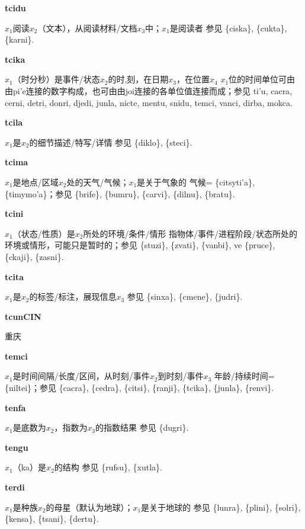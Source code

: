 \documentclass[notitlepage,twocolumn,a4paper,10pt]{book}
\begin{document}
{\sffamily\bfseries tcidu}\enspace {\ttfamily\bfseries[tid]}  $x_1$阅读$x_2$（文本），从阅读材料\slash{}文档$x_3$中；$x_1$是阅读者 \textemdash{} 参见 \{ciska\}, \{cukta\}, \{karni\}.

{\sffamily\bfseries tcika} $x_1$（时分秒）是事件\slash{}状态$x_2$的时,刻，在日期$x_3$，在位置$x_4$ \textemdash{} $x_1$位的时间单位可由由pi'e连接的数字构成，也可由由joi连接的各单位值连接而成；参见 {ti'u}, {cacra}, {cerni}, {detri}, {donri}, {djedi}, {junla}, {nicte}, {mentu}, {snidu}, {temci}, {vanci}, {dirba}, {mokca}.

{\sffamily\bfseries tcila}\enspace {\ttfamily\bfseries[til]}  $x_1$是$x_2$的细节描述\slash{}特写\slash{}详情 \textemdash{} 参见 \{diklo\}, \{steci\}.

{\sffamily\bfseries tcima}\enspace {\ttfamily\bfseries[tim     ti'a]}  $x_1$是地点\slash{}区域$x_2$处的天气\slash{}气候；$x_1$是关于气象的 \textemdash{} 气候= \{citsyti'a\}, \{timymo'a\}；参见 \{brife\}, \{bumru\}, \{carvi\}, \{dilnu\}, \{bratu\}.

{\sffamily\bfseries tcini} $x_1$（状态\slash{}性质）是$x_2$所处的环境\slash{}条件\slash{}情形 \textemdash{} 指物体\slash{}事件\slash{}进程阶段\slash{}状态所处的环境或情形，可能只是暂时的；参见 \{stuzi\}, \{zvati\}, \{vanbi\}, ve \{pruce\}, \{ckaji\}, \{zasni\}.

{\sffamily\bfseries tcita} $x_1$是$x_2$的标签\slash{}标注，展现信息$x_3$ \textemdash{} 参见 \{sinxa\}, \{cmene\}, \{judri\}.

{\sffamily\bfseries tcunCIN} 重庆

{\sffamily\bfseries temci}  $x_1$是时间间隔\slash{}长度\slash{}区间，从时刻\slash{}事件$x_2$到时刻\slash{}事件$x_3$ \textemdash{} 年龄\slash{}持续时间= \{niltei\}；参见 \{cacra\}, \{cedra\}, \{citsi\}, \{ranji\}, \{tcika\}, \{junla\}, \{renvi\}.

{\sffamily\bfseries tenfa}\enspace {\ttfamily\bfseries[tef]}  $x_1$是底数为$x_2$，指数为$x_3$的指数结果 \textemdash{} 参见 \{dugri\}.

{\sffamily\bfseries tengu}\enspace {\ttfamily\bfseries[teg     te'u]}  $x_1$（ka）是$x_2$的结构 \textemdash{} 参见 \{rufsu\}, \{xutla\}.

{\sffamily\bfseries terdi}\enspace {\ttfamily\bfseries[ted]}  $x_1$是种族$x_2$的母星（默认为地球）；$x_1$是关于地球的 \textemdash{} 参见 \{lunra\}, \{plini\}, \{solri\}, \{kensa\}, \{tsani\}, \{dertu\}.
\end{document}
